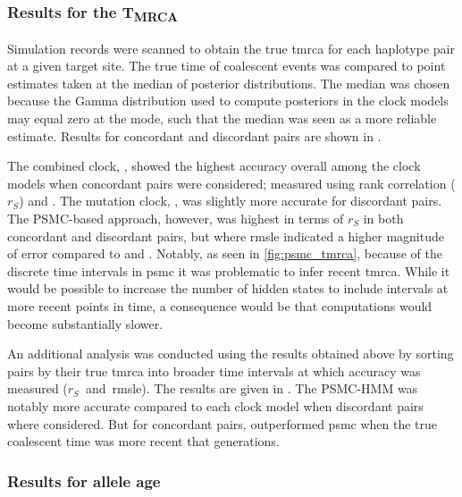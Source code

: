 %
\subsubsection{Results for the T\textsubscript{MRCA}}
%

Simulation records were scanned to obtain the true \gls{tmrca} for each haplotype pair at a given target site.
The true time of coalescent events was compared to point estimates taken at the median of posterior distributions.
The median was chosen because the Gamma distribution used to compute posteriors in the clock models may equal zero at the mode, such that the median was seen as a more reliable estimate.
Results for concordant and discordant pairs are shown in .

%

%

The combined clock, \ClockC, showed the highest accuracy overall among the clock models when concordant pairs were considered; measured using rank correlation ($r_S$) and .
The mutation clock, \ClockM, was slightly more accurate for discordant pairs.
The PSMC-based approach, however, was highest in terms of $r_S$ in both concordant and discordant pairs, but where \gls{rmsle} indicated a higher magnitude of error compared to \ClockC and \ClockM.
Notably, as seen in \cref{fig:psmc_tmrca}, because of the discrete time intervals in \gls{psmc} it was problematic to infer recent \gls{tmrca}.
While it would be possible to increase the number of hidden states to include intervals at more recent points in time, a consequence would be that computations would become substantially slower.

%

%

An additional analysis was conducted using the results obtained above by sorting pairs by their true \gls{tmrca} into broader time intervals at which accuracy was measured ($r_S$~and~\gls{rmsle}).
The results are given in .
The PSMC-HMM was notably more accurate compared to each clock model when discordant pairs where considered.
But for concordant pairs, \ClockC outperformed \gls{psmc} when the true coalescent time was more recent that  generations.



%
\subsubsection{Results for allele age}
%

